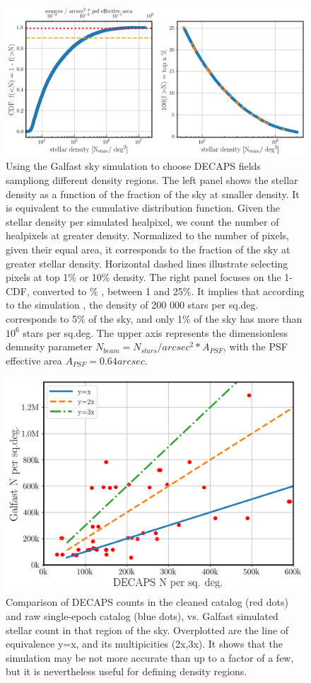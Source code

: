 \documentclass[DM,lsstdraft,toc,usenatbib]{lsstdoc}
\begin{document}
\begin{figure}
\centering
\includegraphics[width=0.95\columnwidth]{figs/MAF_density_definitions.png}
\caption{Using the Galfast sky simulation to choose DECAPS fields sampliong different density regions.  The left panel shows  the stellar density as a function of the fraction of the sky at smaller density.  It is equivalent to the cumulative distribution function. Given the stellar density per simulated healpixel, we count the number of healpixels at greater density. Normalized to the number of pixels, given their equal area, it corresponds to the fraction of the sky at greater stellar density. Horizontal dashed lines illustrate selecting pixels at top 1\% or 10\% density. 
The right panel focuses on the 1-CDF, converted to \% , between 1 and 25\%.  
It implies that according to the simulation , the density of 200 000 stars per sq.deg. corresponds to 5\% of the sky, and only  1\% of the sky has more than $10^{6}$ stars per sq.deg. 
The upper axis represents the dimensionless demnsity parameter $N_{beam} = N_{stars}/{arcsec}^{2} * A_{PSF}$, with the PSF effective area $A_{PSF} = 0.64 {arcsec}$.}
\label{fig:illustrate_density}
\end{figure} 


\begin{figure}
\centering
\includegraphics[width=0.75\columnwidth]{figs/MAF_DECAPS_comparison.png}
\caption{Comparison of DECAPS counts in the cleaned catalog (red dots) and raw single-epoch catalog (blue dots), vs. Galfast simulated stellar count in that region of the sky. Overplotted are the line of equivalence y=x, and its multipicities (2x,3x). It shows that the simulation may be not more accurate than up to a factor of a few, but it is nevertheless useful for defining density regions.}
\label{fig:maf_decaps_compare}
\end{figure} 
\end{document}
